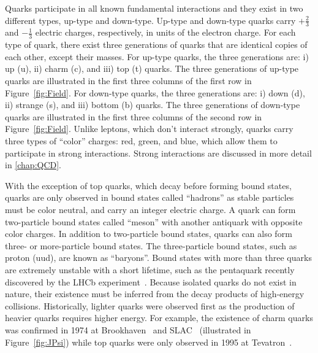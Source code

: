 Quarks participate in all known fundamental interactions and they exist in two different types, up-type and down-type. Up-type and down-type quarks carry $+\frac{2}{3}$ and $-\frac{1}{3}$ electric charges, respectively, in units of the electron charge. For each type of quark, there exist three generations of quarks that are identical copies of each other, except their masses. For up-type quarks, the three generations are: i) up (u), ii) charm (c), and iii) top (t) quarks. The three generations of up-type quarks are illustrated in the first three columns of the first row in Figure~\ref{fig:Field}. For down-type quarks, the three generations are: i) down (d), ii) strange (s), and iii) bottom (b) quarks. The three generations of down-type quarks are illustrated in the first three columns of the second row in Figure~\ref{fig:Field}. Unlike leptons, which don't interact strongly, quarks carry three types of ``color'' charges: red, green, and blue, which allow them to participate in strong interactions. Strong interactions are discussed in more detail in \autoref{chap:QCD}.

With the exception of top quarks, which decay before forming bound states, quarks are only observed in bound states called ``hadrons'' as stable particles must be color neutral, and carry an integer electric charge. A quark can form two-particle bound states called ``meson'' with another antiquark with opposite color charges. In addition to two-particle bound states, quarks can also form three- or more-particle bound states. The three-particle bound states, such as proton (uud), are known as ``baryons''. Bound states with more than three quarks are extremely unstable with a short lifetime, such as the pentaquark recently discovered by the \ac{LHCb} experiment~\cite{LHCb:2015yax}. Because isolated quarks do not exist in nature, their existence must be inferred from the decay products of high-energy collisions. Historically, lighter quarks were observed first as the production of heavier quarks requires higher energy. For example, the existence of charm quarks was confirmed in 1974 at Brookhaven~\cite{E598:1974sol} and SLAC~\cite{SLAC-SP-017:1974ind} (illustrated in Figure~\ref{fig:JPsi}) while top quarks were only observed in 1995 at Tevatron~\cite{CDF:1995wbb,D0:1995jca}.

